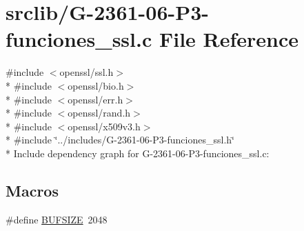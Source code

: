 \hypertarget{_g-2361-06-_p3-funciones__ssl_8c}{}\section{srclib/\+G-\/2361-\/06-\/\+P3-\/funciones\+\_\+ssl.c File Reference}
\label{_g-2361-06-_p3-funciones__ssl_8c}
{\ttfamily \#include $<$openssl/ssl.\+h$>$}\\*
{\ttfamily \#include $<$openssl/bio.\+h$>$}\\*
{\ttfamily \#include $<$openssl/err.\+h$>$}\\*
{\ttfamily \#include $<$openssl/rand.\+h$>$}\\*
{\ttfamily \#include $<$openssl/x509v3.\+h$>$}\\*
{\ttfamily \#include \char`\"{}../includes/\+G-\/2361-\/06-\/\+P3-\/funciones\+\_\+ssl.\+h\char`\"{}}\\*
Include dependency graph for G-\/2361-\/06-\/\+P3-\/funciones\+\_\+ssl.c\+:
\subsection*{Macros}
\begin{DoxyCompactItemize}
\item 
\#define \hyperlink{_g-2361-06-_p3-funciones__ssl_8c_aeca034f67218340ecb2261a22c2f3dcd}{B\+U\+F\+S\+I\+ZE}~2048
\end{DoxyCompactItemize}

